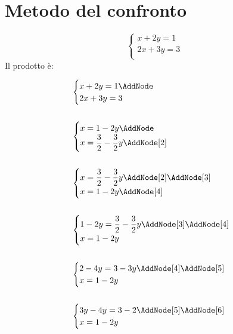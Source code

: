 \section{Metodo del confronto}
\label{sec:metodoconfronto}
\tcbstartrecording
\begin{exercise}
	\[\begin{cases}
	x+2y=1\\
	2x+3y=3\\
	\end{cases}
	\]
	\tcblower
	Il prodotto è:
	\begin{NodesList}[dy=6pt]
		\begin{align*}
		&\begin{cases}
		x+2y=1\AddNode\\
		2x+3y=3\\
		\end{cases}\\
		&\\
		&\begin{cases}
		x=1-2y\AddNode\\
		x=\dfrac{3}{2}-\dfrac{3}{2}y\AddNode[2]\\
		\end{cases}\\
		&\\
		&\begin{cases}
		x=\dfrac{3}{2}-\dfrac{3}{2}y\AddNode[2]\AddNode[3]\\
		x=1-2y\AddNode[4]\\
		\end{cases}\\
		&\\
		&\begin{cases}
		1-2y=\dfrac{3}{2}-\dfrac{3}{2}y\AddNode[3]\AddNode[4]\\
		x=1-2y\\
		\end{cases}\\
		&\\
		&\begin{cases}
		2-4y=3-3y\AddNode[4]\AddNode[5]\\
		x=1-2y\\
		\end{cases}\\
		&\\
		&\begin{cases}
		3y-4y=3-2\AddNode[5]\AddNode[6]\\
		x=1-2y\\
		\end{cases}\\

\end{align*}
\end{NodesList}
\end{exercise}
